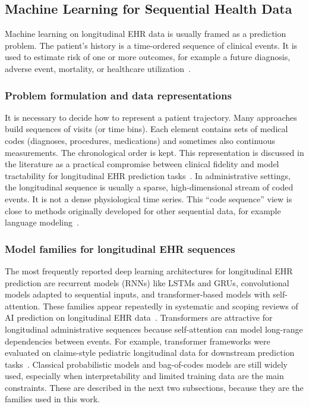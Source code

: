 \subsection{Machine Learning for Sequential Health Data}
\label{sec:ml_sequential_ehr}

Machine learning on longitudinal EHR data is usually framed as a prediction problem. The patient's history is a time-ordered sequence of clinical events. It is used to estimate risk of one or more outcomes, for example a future diagnosis, adverse event, mortality, or healthcare utilization~\cite{carrasco_ribelles_2023_jamia, moglia_2025_bmc}.

\subsubsection{Problem formulation and data representations}
\label{subsec:problem_formulation}

It is necessary to decide how to represent a patient trajectory. Many approaches build sequences of visits (or time bins). Each element contains sets of medical codes (diagnoses, procedures, medications) and sometimes also continuous measurements. The chronological order is kept. This representation is discussed in the literature as a practical compromise between clinical fidelity and model tractability for longitudinal EHR prediction tasks~\cite{carrasco_ribelles_2023_jamia, moglia_2025_bmc}. In administrative settings, the longitudinal sequence is usually a sparse, high-dimensional stream of coded events. It is not a dense physiological time series. This ``code sequence'' view is close to methods originally developed for other sequential data, for example language modeling~\cite{pubmed_37652934}.

\subsubsection{Model families for longitudinal EHR sequences}
\label{subsec:model_families}

The most frequently reported deep learning architectures for longitudinal EHR prediction are recurrent models (RNNs) like LSTMs and GRUs, convolutional models adapted to sequential inputs, and transformer-based models with self-attention. These families appear repeatedly in systematic and scoping reviews of AI prediction on longitudinal EHR data~\cite{carrasco_ribelles_2023_jamia, moglia_2025_bmc}. Transformers are attractive for longitudinal administrative sequences because self-attention can model long-range dependencies between events. For example, transformer frameworks were evaluated on claims-style pediatric longitudinal data for downstream prediction tasks~\cite{nature_claims_transformer_2022}. Classical probabilistic models and bag-of-codes models are still widely used, especially when interpretability and limited training data are the main constraints. These are described in the next two subsections, because they are the families used in this work.

